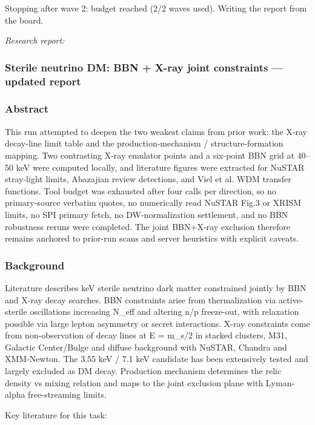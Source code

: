 \documentclass[11pt,a4paper]{article}
\begin{document}
Stopping after wave 2: budget reached (2/2 waves used). Writing the report from the board.

\textit{Research report:}\par
\subsubsection*{Sterile neutrino DM: BBN + X-ray joint constraints --- updated report}
\subsubsection*{Abstract}
This run attempted to deepen the two weakest claims from prior work: the X-ray decay-line limit table and the production-mechanism / structure-formation mapping. Two contrasting X-ray emulator points and a six-point BBN grid at 40--50 keV were computed locally, and literature figures were extracted for NuSTAR stray-light limits, Abazajian review detections, and Viel et al. WDM transfer functions. Tool budget was exhausted after four calls per direction, so no primary-source verbatim quotes, no numerically read NuSTAR Fig.3 or XRISM limits, no SPI primary fetch, no DW-normalization settlement, and no BBN robustness reruns were completed. The joint BBN+X-ray exclusion therefore remains anchored to prior-run scans and server heuristics with explicit caveats.

\subsubsection*{Background}
Literature describes keV sterile neutrino dark matter constrained jointly by BBN and X-ray decay searches. BBN constraints arise from thermalization via active-sterile oscillations increasing N\_eff and altering n/p freeze-out, with relaxation possible via large lepton asymmetry or secret interactions. X-ray constraints come from non-observation of decay lines at E = m\_s/2 in stacked clusters, M31, Galactic Center/Bulge and diffuse background with NuSTAR, Chandra and XMM-Newton. The 3.55 keV / 7.1 keV candidate has been extensively tested and largely excluded as DM decay. Production mechanism determines the relic density vs mixing relation and maps to the joint exclusion plane with Lyman-alpha free-streaming limits.

Key literature for this task:
\end{document}
